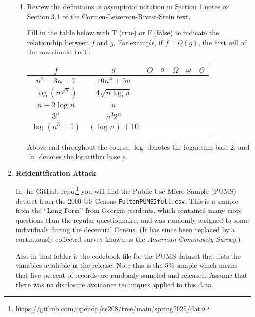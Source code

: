 \documentclass[11pt]{article}
\begin{document}
\begin{enumerate}[leftmargin=*]
\begin{enumerate}
    
    \item Review the definitions of asymptotic notation in Section 1 notes or Section 3.1 of the Cormen-Leiserson-Rivest-Stein text. 

    Fill in the table below with T (true) or F (false) to indicate the relationship between $f$ and $g$. For example, if $f=O(g)$, the first cell of the row should be T.


    \begin{center}
    \begin{tabular}{|c|c|c|c|c|c|c|}
    \hline
         $f$ & $g$ & $O$ & $o$ & $\Omega$ & $\omega$ & $\Theta$\\
         \hline
         $n^2 + 3n + 7$ & $10n^3 + 5n$ & & & & & \\            
         \hline
         $\log ( n^{\sqrt{n}})$ & $4\sqrt{n \log n}$ & & & & & \\
         \hline
         $n + 2\log n$ & $n$ & & & & & \\
         \hline
         $3^n$ & $n^3 2^n$ & & & & & \\
         \hline
         $\log(n^3 + 1)$ & $(\log n) + 10$ & & & & & \\
         \hline
    \end{tabular}
\end{center}

    
    Above and throughout the course, $\log$ denotes the logarithm base 2, and $\ln$ denotes the logarithm base $e$.
    

\end{enumerate}

\item \textbf{Reidentification Attack}

In the GitHub repo,\footnote{\url{https://github.com/opendp/cs208/tree/main/spring2025/data}} you will find the Public Use Micro Sample (PUMS) dataset from the 2000 US Census \texttt{FultonPUMS5full.csv}.  This is a sample from the ``Long Form'' from Georgia residents, which contained many more questions than the regular questionnaire, and was randomly assigned to some individuals during the decennial Census. (It has since been replaced by a continuously collected survey known as the \emph{American Community Survey}.)  

Also in that folder is the codebook file for the PUMS dataset that lists the variables available in the release.  Note this is the 5\% sample which means that five percent of records are randomly sampled and released.
Assume that there was no disclosure avoidance techniques applied to this data.


\end{enumerate}
\end{document}
